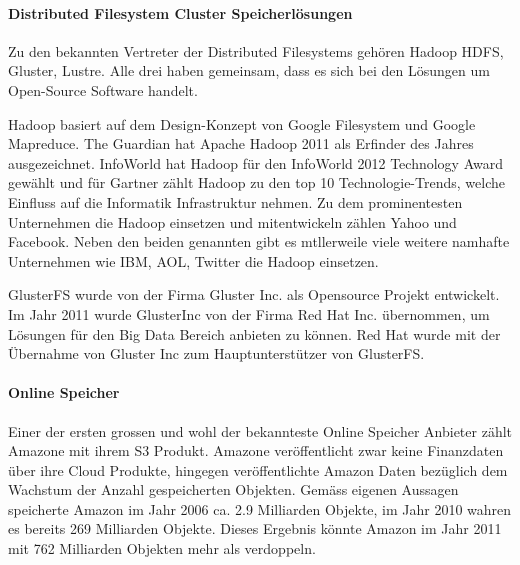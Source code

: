 \paragraph*{Distributed Filesystem Cluster Speicherlösungen}
Zu den bekannten Vertreter der Distributed Filesystems gehören Hadoop HDFS, Gluster, Lustre. Alle drei haben gemeinsam, dass es sich bei den Lösungen um Open-Source Software handelt.

Hadoop basiert auf dem Design-Konzept von Google Filesystem und Google Mapreduce. The Guardian hat Apache Hadoop 2011 als Erfinder des Jahres ausgezeichnet. InfoWorld hat Hadoop für den InfoWorld 2012 Technology Award gewählt und für Gartner zählt Hadoop zu den top 10 Technologie-Trends, welche Einfluss auf die Informatik Infrastruktur nehmen. 
Zu dem prominentesten Unternehmen die Hadoop einsetzen und mitentwickeln zählen Yahoo und Facebook. Neben den beiden genannten gibt es mtllerweile viele weitere namhafte Unternehmen wie IBM, AOL, Twitter die Hadoop einsetzen. \cite{Guardian}\cite{Wayner2012}\cite{Casonato2012}\cite{Hadoop2012}

GlusterFS wurde von der Firma Gluster Inc. als Opensource Projekt entwickelt. Im Jahr 2011 wurde GlusterInc von der Firma Red Hat Inc. übernommen, um Lösungen für den Big Data Bereich anbieten zu können. Red Hat wurde mit der Übernahme von Gluster Inc zum Hauptunterstützer von GlusterFS.

\paragraph*{Online Speicher}
Einer der ersten grossen und wohl der bekannteste Online Speicher Anbieter zählt Amazone mit ihrem S3 Produkt. Amazone veröffentlicht zwar keine Finanzdaten über ihre Cloud Produkte, hingegen veröffentlichte Amazon Daten bezüglich dem Wachstum der Anzahl gespeicherten Objekten. Gemäss eigenen Aussagen speicherte Amazon im Jahr 2006 ca. 2.9 Milliarden Objekte, im Jahr 2010 wahren es bereits 269 Milliarden Objekte. Dieses Ergebnis könnte Amazon im Jahr 2011 mit 762 Milliarden Objekten mehr als verdoppeln. \cite{Barr2012}

